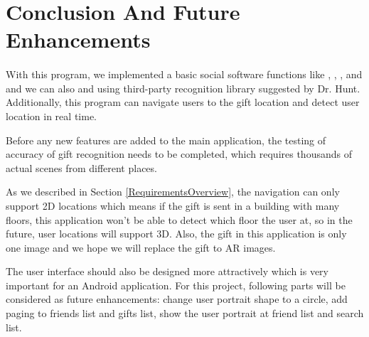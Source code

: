 \section{Conclusion And Future Enhancements}												
\label{sec:conclusion}
\paragraph{} With this program, we implemented a basic social software functions like , , ,  and  and we can also  and  using third-party recognition library suggested by Dr. Hunt. Additionally, this program can navigate users to the gift location and detect user location in real time.
\par Before any new features are added to the main application, the testing of accuracy of gift recognition needs to be completed, which requires thousands of actual scenes from different places.
\par As we described in Section \ref{RequirementsOverview}, the navigation can only support 2D locations which means if the gift is sent in a building with many floors, this application won't be able to detect which floor the user at, so in the future, user locations will support 3D. Also, the gift in this application is only one image and we hope we will replace the gift to AR images.
\par The user interface should also be designed more attractively which is very important for an Android application. For this project, following parts will be considered as future enhancements: change user portrait shape to a circle, add paging to friends list and gifts list, show the user portrait at friend list and search list. 